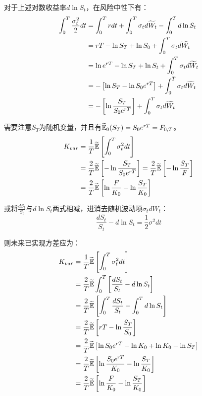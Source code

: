 \documentclass[11pt]{article}
\begin{document}
对于上述对数收益率$d\ln S_t$，在风险中性下有：
\begin{align*}
    \int^T_0 \frac{\sigma^2_t}{2} dt 
    &= \int^T_0 r dt + \int^T_0 \sigma_t d\widetilde{W}_t -\int^T_0 d\ln S_t \\
    &= rT - \ln S_T + \ln S_0 + \int^T_0 \sigma_t d\widetilde{W}_t \\
    &= \ln e^{rT} -\ln S_T + \ln S_t + \int^T_0 \sigma_t d\widetilde{W}_t \\
    &= - \left[ \ln S_T - \ln S_0 e^{rT} \right] + \int^T_0 \sigma_t d\widetilde{W}_t \\
    &= - \left[ \ln \frac{S_T}{S_0 e^{rT}} \right] + \int^T_0 \sigma_t d\widetilde{W}_t
\end{align*}

需要注意$S_T$为随机变量，并且有$\widetilde{\mathbb{E}}_0(S_T)=S_0 e^{rT}=F_{0,T}$。
\begin{align*}
    K_{var} &= \frac{1}{T} \widetilde{\mathbb{E}} \left[ \int^T_0 \sigma^2_t dt \right] \\
    &= \frac{2}{T} \widetilde{\mathbb{E}} \left[ - \ln\frac{S_T}{S_0 e^{rT}} \right] 
    = \frac{2}{T} \widetilde{\mathbb{E}} \left[ - \ln\frac{S_T}{F} \right] \\
    &= \frac{2}{T} \widetilde{\mathbb{E}} \left[\ln\frac{F}{K_0} - \ln\frac{S_T}{K_0}  \right]
\end{align*}

或将$\frac{dS_t}{S_t}$与$d\ln S_t$两式相减，进消去随机波动项$\sigma_t dW_t$：
\begin{equation*}
    \frac{d S_t}{S_t} - d \ln S_t = \frac{1}{2}\sigma^2 dt
\end{equation*}

则未来已实现方差应为：
\begin{align*}
    K_{var} &= \frac{1}{T} \widetilde{\mathbb{E}} \left[ \int^T_0 \sigma^2_t dt \right] \\
    &= \frac{2}{T} \widetilde{\mathbb{E}} \int^T_0 \left[ \frac{d S_t}{S_t} - d \ln S_t \right] \\
    &= \frac{2}{T} \widetilde{\mathbb{E}} \left[ \int^T_0 \frac{d S_t}{S_t} - \int^T_0 d \ln S_t \right] \\
    &= \frac{2}{T} \widetilde{\mathbb{E}} \left[ rT  - \ln \frac{S_T}{S_0} \right] \\
    &= \frac{2}{T} \widetilde{\mathbb{E}} \left[ \ln S_0 e^{rT} -\ln K_0 + \ln K_0 - \ln S_T \right] \\
    &= \frac{2}{T} \widetilde{\mathbb{E}} \left[ \ln \frac{S_0 e^{rT}}{K_0} - \ln \frac{S_T}{K_0} \right] \\
    &= \frac{2}{T} \widetilde{\mathbb{E}} \left[ \ln \frac{F}{K_0} - \ln \frac{S_T}{K_0} \right]
\end{align*}
\end{document}
